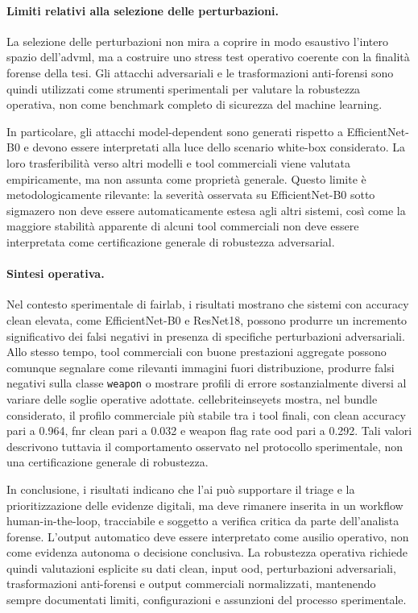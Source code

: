 \paragraph{Limiti relativi alla selezione delle perturbazioni.}

La selezione delle perturbazioni non mira a coprire in modo esaustivo l'intero
spazio dell'\gls{advml}, ma a costruire uno stress test operativo coerente con
la finalità forense della tesi. Gli attacchi adversariali e le trasformazioni
anti-forensi sono quindi utilizzati come strumenti sperimentali per valutare la
robustezza operativa, non come benchmark completo di sicurezza del machine
learning.

In particolare, gli attacchi model-dependent sono generati rispetto a
EfficientNet-B0 e devono essere interpretati alla luce dello scenario white-box
considerato. La loro trasferibilità verso altri modelli e tool commerciali viene
valutata empiricamente, ma non assunta come proprietà generale. Questo limite è
metodologicamente rilevante: la severità osservata su EfficientNet-B0 sotto
\gls{sigmazero} non deve essere automaticamente estesa agli altri sistemi, così
come la maggiore stabilità apparente di alcuni tool commerciali non deve essere
interpretata come certificazione generale di robustezza adversarial.

\paragraph{Sintesi operativa.}

Nel contesto sperimentale di \gls{fairlab}, i risultati mostrano che sistemi con
accuracy clean elevata, come EfficientNet-B0 e ResNet18, possono produrre un
incremento significativo dei falsi negativi in presenza di specifiche
perturbazioni adversariali. Allo stesso tempo, tool commerciali con buone
prestazioni aggregate possono comunque segnalare come rilevanti immagini fuori
distribuzione, produrre falsi negativi sulla classe \texttt{weapon} o mostrare
profili di errore sostanzialmente diversi al variare delle soglie operative
adottate. \gls{cellebriteinseyets} mostra, nel bundle considerato, il profilo
commerciale più stabile tra i tool finali, con clean accuracy pari a 0.964,
\gls{fnr} clean pari a 0.032 e weapon flag rate \gls{ood} pari a 0.292. Tali
valori descrivono tuttavia il comportamento osservato nel protocollo
sperimentale, non una certificazione generale di robustezza.

In conclusione, i risultati indicano che l'\gls{ai} può supportare il triage e
la prioritizzazione delle evidenze digitali, ma deve rimanere inserita in un
workflow human-in-the-loop, tracciabile e soggetto a verifica critica da parte
dell'analista forense. L'output automatico deve essere interpretato come ausilio
operativo, non come evidenza autonoma o decisione conclusiva. La robustezza
operativa richiede quindi valutazioni esplicite su dati clean, input \gls{ood},
perturbazioni adversariali, trasformazioni anti-forensi e output commerciali
normalizzati, mantenendo sempre documentati limiti, configurazioni e assunzioni
del processo sperimentale.
